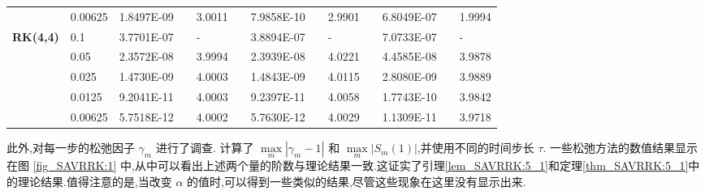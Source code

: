 \begin{table}[H]
\begin{tabular}{lllllrlrlrlrlrl}
\multicolumn{2}{l}{} & \multicolumn{2}{l}{0.00625} & 1.8497E-09 &       & 3.0011  &       & 7.9858E-10 &       & 2.9901  &       & 6.8049E-07 &       & 1.9994  \\
\multicolumn{2}{l}{\multirow{5}[1]{*}{\textbf{RK(4,4)}}} & \multicolumn{2}{l}{0.1} & 3.7701E-07 &       & -     &       & 3.8894E-07 &       & -     &       & 7.0733E-07 &       & - \\
\multicolumn{2}{l}{} & \multicolumn{2}{l}{0.05} & 2.3572E-08 &       & 3.9994  &       & 2.3939E-08 &       & 4.0221  &       & 4.4585E-08 &       & 3.9878  \\
\multicolumn{2}{l}{} & \multicolumn{2}{l}{0.025} & 1.4730E-09 &       & 4.0003  &       & 1.4843E-09 &       & 4.0115  &       & 2.8080E-09 &       & 3.9889  \\
\multicolumn{2}{l}{} & \multicolumn{2}{l}{0.0125} & 9.2041E-11 &       & 4.0003  &       & 9.2397E-11 &       & 4.0058  &       & 1.7743E-10 &       & 3.9842  \\
\multicolumn{2}{l}{} & \multicolumn{2}{l}{0.00625} & 5.7518E-12 &       & 4.0002  &       & 5.7630E-12 &       & 4.0029  &       & 1.1309E-11 &       & 3.9718  \\
\bottomrule
\end{tabular}%
\label{tab_SAVRRK:6-1}%
\end{table}%
此外,对每一步的松弛因子 $\gamma_m$ 进行了调查.
计算了 $\max\limits _m\left|\gamma_m-1\right|$ 和 $\max\limits _m\left|S_m(1)\right|$,并使用不同的时间步长 $\tau$.
一些松弛方法的数值结果显示在图 \ref{fig_SAVRRK:1} 中,从中可以看出上述两个量的阶数与理论结果一致.这证实了引理\ref{lem_SAVRRK:5_1}和定理\ref{thm_SAVRRK:5_1}中的理论结果.值得注意的是,当改变 $\alpha$ 的值时,可以得到一些类似的结果,尽管这些现象在这里没有显示出来.

